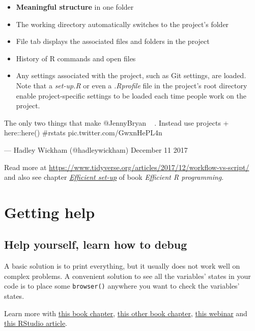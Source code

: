 \documentclass[]{book}
\providecommand{\tightlist}{%
  \setlength{\itemsep}{0pt}\setlength{\parskip}{0pt}}
\begin{document}
\begin{itemize}
  \begin{itemize}
  \tightlist
  \item
    \textbf{Meaningful structure} in one folder
  \item
    The working directory automatically switches to the project's folder
  \item
    File tab displays the associated files and folders in the project
  \item
    History of R commands and open files
  \item
    Any settings associated with the project, such as Git settings, are
    loaded. Note that a \emph{set-up.R} or even a \emph{.Rprofile} file
    in the project's root directory enable project-specific settings to
    be loaded each time people work on the project.
  \end{itemize}
\end{itemize}

The only two things that make @JennyBryan 😤😠🤯. Instead use projects +
here::here() \#rstats pic.twitter.com/GwxnHePL4n

--- Hadley Wickham (@hadleywickham) December 11 2017

Read more at
\url{https://www.tidyverse.org/articles/2017/12/workflow-vs-script/} and
also see chapter
\href{https://bookdown.org/csgillespie/efficientR/set-up.html}{\emph{Efficient
set-up}} of book \emph{Efficient R programming}.

\section{Getting help}\label{getting-help}

\subsection{Help yourself, learn how to
debug}\label{help-yourself-learn-how-to-debug}

A basic solution is to print everything, but it usually does not work
well on complex problems. A convenient solution to see all the
variables' states in your code is to place some \texttt{browser()}
anywhere you want to check the variables' states.

Learn more with
\href{https://bookdown.org/rdpeng/rprogdatascience/debugging.html}{this
book chapter},
\href{http://adv-r.had.co.nz/Exceptions-Debugging.html}{this other book
chapter},
\href{https://www.rstudio.com/resources/videos/debugging-techniques-in-rstudio/}{this
webinar} and
\href{https://support.rstudio.com/hc/en-us/articles/205612627-Debugging-with-RStudio}{this
RStudio article}.
\end{document}
